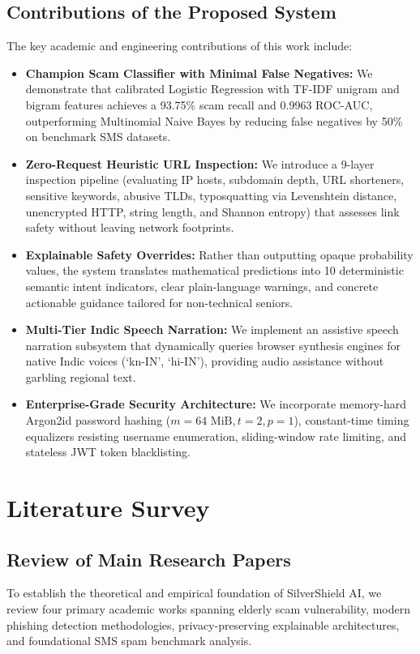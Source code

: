 \documentclass[conference]{IEEEtran}
\begin{document}
\subsection{Contributions of the Proposed System}
The key academic and engineering contributions of this work include:
\begin{itemize}
    \item \textbf{Champion Scam Classifier with Minimal False Negatives:} We demonstrate that calibrated Logistic Regression with TF-IDF unigram and bigram features achieves a 93.75\% scam recall and 0.9963 ROC-AUC, outperforming Multinomial Naive Bayes by reducing false negatives by 50\% on benchmark SMS datasets.
    \item \textbf{Zero-Request Heuristic URL Inspection:} We introduce a 9-layer inspection pipeline (evaluating IP hosts, subdomain depth, URL shorteners, sensitive keywords, abusive TLDs, typosquatting via Levenshtein distance, unencrypted HTTP, string length, and Shannon entropy) that assesses link safety without leaving network footprints.
    \item \textbf{Explainable Safety Overrides:} Rather than outputting opaque probability values, the system translates mathematical predictions into 10 deterministic semantic intent indicators, clear plain-language warnings, and concrete actionable guidance tailored for non-technical seniors.
    \item \textbf{Multi-Tier Indic Speech Narration:} We implement an assistive speech narration subsystem that dynamically queries browser synthesis engines for native Indic voices (`kn-IN', `hi-IN'), providing audio assistance without garbling regional text.
    \item \textbf{Enterprise-Grade Security Architecture:} We incorporate memory-hard Argon2id password hashing ($m=64\text{ MiB}, t=2, p=1$), constant-time timing equalizers resisting username enumeration, sliding-window rate limiting, and stateless JWT token blacklisting.
\end{itemize}

\section{Literature Survey}

\subsection{Review of Main Research Papers}
To establish the theoretical and empirical foundation of SilverShield AI, we review four primary academic works spanning elderly scam vulnerability, modern phishing detection methodologies, privacy-preserving explainable architectures, and foundational SMS spam benchmark analysis.
\end{document}
